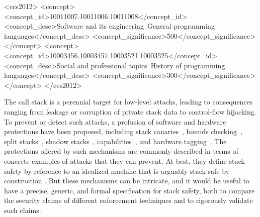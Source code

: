 \documentclass[acmtog,review,anonymous]{acmart}\settopmatter{printfolios=true,printccs=false,printacmref=false}
\begin{document}


\begin{CCSXML}
<ccs2012>
<concept>
<concept_id>10011007.10011006.10011008</concept_id>
<concept_desc>Software and its engineering~General programming languages</concept_desc>
<concept_significance>500</concept_significance>
</concept>
<concept>
<concept_id>10003456.10003457.10003521.10003525</concept_id>
<concept_desc>Social and professional topics~History of programming languages</concept_desc>
<concept_significance>300</concept_significance>
</concept>
</ccs2012>
\end{CCSXML}



\ifcameraready
{}  %
\fi


\maketitle


The call stack is a perennial target for low-level attacks, leading to
consequences ranging from leakage or corruption of private stack data to
control-flow hijacking. To prevent or detect such attacks, a profusion of
software and hardware protections have been proposed,
%
including stack canaries~\citep{Cowan+98},
bounds checking~\citep{NagarakatteZMZ09,NagarakatteZMZ10,DeviettiBMZ08},
split stacks~\citep{Kuznetsov+14},
shadow stacks~\citep{Dang+15,Shanbhogue+19},
capabilities~\citep{Woodruff+14,Chisnall+15,SkorstengaardLocal,SkorstengaardSTK,Georges+21},
and hardware tagging~\citep{DBLP:conf/sp/RoesslerD18}.
%
The protections offered by such mechanisms are commonly described in terms
of concrete examples of attacks that they can prevent.
At best, they define stack safety by reference to an idealized machine that
is arguably stack safe by construction \citep{SkorstengaardSTK}.
But these mechanisms can be intricate, and it would be useful to have a precise, generic, and formal
specification for stack safety, both to compare the security claims of different
enforcement techniques and to rigorously validate such claims.
\end{document}
